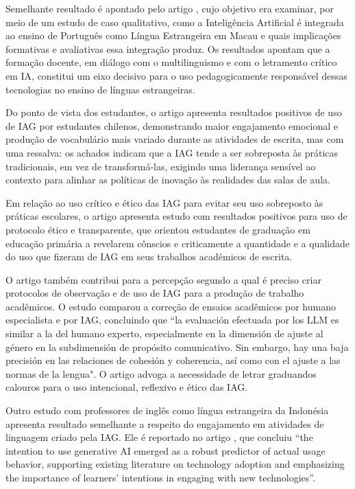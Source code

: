 \documentclass[portuguese]{textolivre}
\begin{document}
Semelhante resultado é apontado pelo artigo , cujo objetivo era examinar, por meio de um estudo de caso qualitativo, como a Inteligência Artificial é integrada ao ensino de Português como Língua Estrangeira em Macau e quais implicações formativas e avaliativas essa integração produz. Os resultados apontam que a formação docente, em diálogo com o multilinguismo e com o letramento crítico em IA, constitui um eixo decisivo para o uso pedagogicamente responsável dessas tecnologias no ensino de línguas estrangeiras.

Do ponto de vista dos estudantes, o artigo  apresenta resultados positivos de uso de IAG por estudantes chilenos, demonstrando maior engajamento emocional e produção de vocabulário mais variado durante as atividades de escrita, mas com uma ressalva: os achados indicam que a IAG tende a ser sobreposta às práticas tradicionais, em vez de transformá-las, exigindo uma liderança sensível ao contexto para alinhar as políticas de inovação às realidades das salas de aula.

Em relação ao uso crítico e ético das IAG para evitar seu uso sobreposto às práticas escolares, o artigo  apresenta estudo com resultados positivos para uso de protocolo ético e transparente, que orientou estudantes de graduação em educação primária a revelarem cônscios e criticamente a quantidade e a qualidade do uso que fizeram de IAG em seus trabalhos acadêmicos de escrita. 

O artigo  também contribui para a percepção segundo a qual é preciso criar protocolos de observação e de uso de IAG para a produção de trabalho acadêmicos. O estudo comparou a correção de ensaios acadêmicos por humano especialista e por IAG, concluindo que “la evaluación efectuada por los LLM es similar a la del humano experto, especialmente en la dimensión de ajuste al género en la subdimensión de propósito comunicativo. Sin embargo, hay una baja precisión en las relaciones de cohesión y coherencia, así como con el ajuste a las normas de la lengua". O artigo advoga a necessidade de letrar graduandos calouros para o uso intencional, reflexivo e ético das IAG.

Outro estudo com professores de inglês como língua estrangeira da Indonésia apresenta resultado semelhante a respeito do engajamento em atividades de linguagem criado pela IAG. Ele é reportado no artigo , que concluiu “the intention to use generative AI emerged as a robust predictor of actual usage behavior, supporting existing literature on technology adoption and emphasizing the importance of learners’ intentions in engaging with new technologies”.
\end{document}
